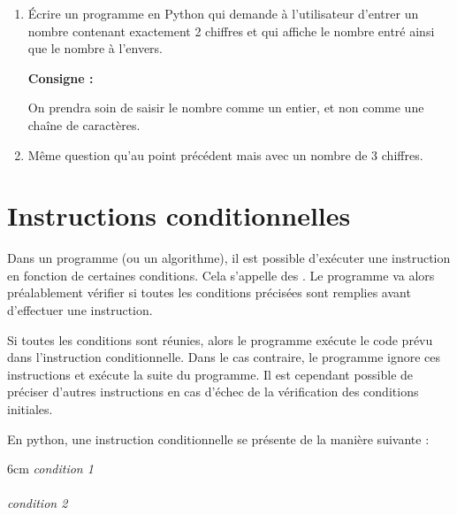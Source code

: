 \begin{boxexstheorieligne}
\eexo




\exo
\vspace*{-0.7cm}
\begin{enumerate}[label=\alph*)]
\item Écrire un programme en Python qui demande à l'utilisateur d'entrer un nombre contenant exactement 2 chiffres et qui affiche le nombre entré ainsi que le nombre à l'envers.

\vspace{0mm}
\textbf{Consigne : }\begin{minipage}[t]{0.82\textwidth}
On prendra soin de saisir le nombre comme un entier, et non comme une chaîne de caractères.
\end{minipage}
\item Même question qu'au point précédent mais avec un nombre de 3 chiffres.
\end{enumerate}

\end{boxexstheorieligne}
\clearpage




\section{Instructions conditionnelles}
Dans un programme (ou un algorithme), il est possible d'exécuter une instruction en fonction de certaines conditions. Cela s'appelle des . Le programme va alors préalablement vérifier si toutes les conditions précisées sont remplies avant d'effectuer une instruction.

\medskip
Si toutes les conditions sont réunies, alors le programme exécute le code prévu dans l'instruction conditionnelle. Dans le cas contraire, le programme ignore ces instructions et exécute la suite du programme. Il est cependant possible de préciser d'autres instructions en cas d'échec de la vérification des conditions initiales.

\medskip
En python, une instruction conditionnelle se présente de la manière suivante :

\begin{center}
\begin{encadre}{6cm}
 {\it condition 1} \comp{:} \\ \medskip
\hspace*{7mm} {\it <instruction 1>}\\ 
 {\it condition 2} \comp{:} \\ 
\hspace*{7mm} {\it <instruction 2>}\\
 \\
\hspace*{7mm} {\it <instruction 3>}
\end{encadre}
\end{center}

